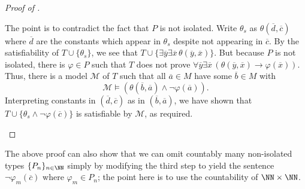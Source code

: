 \documentclass[../notes.tex]{subfiles}
\begin{document}
\begin{proof}[Proof of ]
\begin{enumerate}
		The point is to contradict the fact that $P$ is not isolated. Write $\theta_s$ as $\theta(\overline d,\overline c)$ where $\overline d$ are the constants which appear in $\theta_s$ despite not appearing in $\overline c$. By the satisfiability of $T\cup\{\theta_s\}$, we see that $T\cup\{\exists\overline y\exists\overline x\,\theta(\overline y,\overline x)\}$. But because $P$ is not isolated, there is $\varphi\in P$ such that $T$ does not prove $\forall\overline y\exists\overline x\,(\theta(\overline y,\overline x)\to\varphi(\overline x))$. Thus, there is a model $\mathcal M$ of $T$ such that all $\overline a\in M$ have some $\overline b\in M$ with
		\[\mathcal M\models(\theta(\overline b,\overline a)\land\lnot\varphi(\overline a)).\]
		Interpreting constants in $(\overline d,\overline c)$ as in $(\overline b,\overline a)$, we have shown that $T\cup\{\theta_s\land\lnot\varphi(\overline c)\}$ is satisfiable by $\mathcal M$, as required.
		\qedhere
	\end{enumerate}
\end{proof}
\begin{remark} \label{rem:omit-countable-types}
	The above proof can also show that we can omit countably many non-isolated types $\{P_n\}_{n\in\NN}$ simply by modifying the third step to yield the sentence $\lnot\varphi_m(\overline c)$ where $\varphi_m\in P_n$; the point here is to use the countability of $\NN\times\NN$.
\end{remark}
\end{document}
